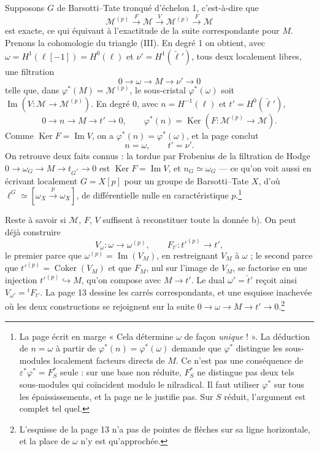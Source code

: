 \documentclass[11pt,a4paper]{article}
\begin{document}
Supposons $G$ de Barsotti--Tate tronqué d'échelon 1, c'est-à-dire que
\[
\mathcal{M}^{(p)} \xrightarrow{F} \mathcal{M} \xrightarrow{V}
\mathcal{M}^{(p)} \xrightarrow{F} \mathcal{M}
\]
est exacte, ce qui équivaut à l'exactitude de la suite correspondante pour
$M$. Prenons la cohomologie du triangle (III). En degré 1 on obtient, avec
$\omega = H^{1}(\ell[-1]) = H^{0}(\ell)$ et $\nu' = H^{1}(\check\ell')$,
tous deux localement libres, une filtration
\[
0 \to \omega \to M \to \nu' \to 0
\]
telle que, dans $\varphi^{*}(M) = \mathcal{M}^{(p)}$, le sous-cristal
$\varphi^{*}(\omega)$ soit $\operatorname{Im}(V\colon \mathcal{M} \to
\mathcal{M}^{(p)})$. En degré 0, avec $n = H^{-1}(\ell)$ et $t' =
H^{0}(\check\ell')$,
\[
0 \to n \to M \to t' \to 0, \qquad
\varphi^{*}(n) = \operatorname{Ker}(F\colon \mathcal{M}^{(p)} \to \mathcal{M}).
\]
Comme $\operatorname{Ker} F = \operatorname{Im} V$, on a
$\varphi^{*}(n) = \varphi^{*}(\omega)$, et la page conclut
\[
n = \omega, \qquad t' = \nu' .
\]
On retrouve deux faits connus : la tordue par Frobenius de la filtration de
Hodge $0 \to \omega_{G} \to M \to t_{G^{*}} \to 0$ est
$\operatorname{Ker} F = \operatorname{Im} V$, et $n_{G} \simeq \omega_{G}$ —
ce qu'on voit aussi en écrivant localement $G = X[p]$ pour un groupe de
Barsotti--Tate $X$, d'où $\ell^{G} \simeq [\omega_{X} \xrightarrow{p}
\omega_{X}]$, de différentielle nulle en caractéristique
$p$.\footnote{La page écrit
en marge « Cela détermine $\omega$ de façon \emph{unique} ! ». La déduction
de $n = \omega$ à partir de $\varphi^{*}(n) = \varphi^{*}(\omega)$ demande que
$\varphi^{*}$ distingue les sous-modules localement facteurs directs de $M$.
Ce n'est pas une conséquence de $\varepsilon^{*}\varphi^{*} = F_{S}^{*}$
seule : sur une base non réduite, $F_{S}^{*}$ ne distingue pas deux tels
sous-modules qui coïncident modulo le nilradical. Il faut utiliser
$\varphi^{*}$ sur tous les épaississements, et la page ne le justifie pas.
Sur $S$ réduit, l'argument est complet tel quel.}

Reste à savoir si $\mathcal{M}$, $F$, $V$ suffisent à reconstituer toute la
donnée b). On peut déjà construire
\[
V_{\omega}\colon \omega \to \omega^{(p)}, \qquad
F_{t'}\colon t'^{(p)} \to t',
\]
le premier parce que $\omega^{(p)} = \operatorname{Im}(V_{M})$, en restreignant
$V_{M}$ à $\omega$ ; le second parce que $t'^{(p)} =
\operatorname{Coker}(V_{M})$ et que $F_{M}$, nul sur l'image de $V_{M}$, se
factorise en une injection $t'^{(p)} \hookrightarrow M$, qu'on compose avec
$M \to t'$. Le dual $\omega' = \check t'$ reçoit ainsi $V_{\omega'} =
{}^{t}F_{t'}$. La page 13 dessine les carrés correspondants, et une esquisse
inachevée où les deux constructions se rejoignent sur la suite
$0 \to \omega \to M \to t' \to 0$.\footnote{L'esquisse de la page 13 n'a pas
de pointes de flèches sur sa ligne horizontale, et la place de $\omega$ n'y
est qu'approchée.}
\end{document}
